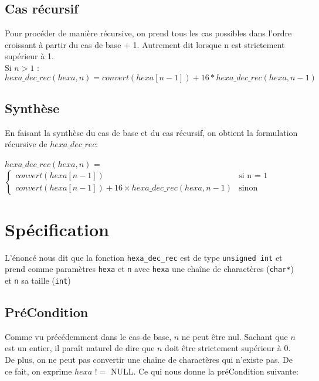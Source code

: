 \documentclass[a4paper, 11pt, oneside]{article}
\begin{document}
\subsection{Cas récursif}

Pour procéder de manière récursive, on prend tous les cas possibles dans l'ordre croissant à partir du cas de base + 1. Autrement dit lorsque n est strictement supérieur à 1.\\

Si $n > 1$ :\\

$hexa\_dec\_rec(hexa, n) = convert(hexa[n - 1]) + 16 * hexa\_dec\_rec(hexa, n - 1)$\\

\subsection{Synthèse}
En faisant la synthèse du cas de base et du cas récursif, on obtient la formulation récursive de $hexa\_dec\_rec$:


$hexa\_dec\_rec(hexa, n)$ = $\left\{
    \begin{array}{ll}
        convert(hexa[n-1]) & \mbox{si n = 1}\\
        convert(hexa[n-1]) + 16 \times hexa\_dec\_rec(hexa, n-1) & \mbox{sinon}
    \end{array}
\right.$


\section{Spécification}\label{specification}
%
%
L'énoncé nous dit que la fonction \texttt{hexa\_dec\_rec} est de type \texttt{unsigned int} et prend comme paramètres \texttt{hexa} et \texttt{n} avec \texttt{hexa} une chaîne de charactères (\texttt{char*}) et \texttt{n} sa taille (\texttt{int})

\subsection{PréCondition}

Comme vu précédemment dans le cas de base, $n$ ne peut être nul. Sachant que $n$ est un entier, il paraît naturel de dire que $n$ doit être strictement supérieur à 0.
De plus, on ne peut pas convertir une chaîne de charactères qui n'existe pas. De ce fait, on exprime $hexa$ $!=$ NULL. Ce qui nous donne la préCondition suivante:\\
\end{document}
